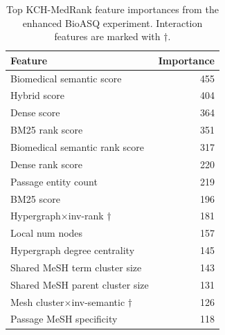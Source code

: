 \begin{table}[t]
\centering
\small
\caption{Top KCH-MedRank feature importances from the enhanced BioASQ experiment. Interaction features are marked with $\dagger$.}
\label{tab:feature-importance-summary}
\begin{tabular}{lr}
\toprule
Feature & Importance \\
\midrule
Biomedical semantic score & 455 \\
Hybrid score & 404 \\
Dense score & 364 \\
BM25 rank score & 351 \\
Biomedical semantic rank score & 317 \\
Dense rank score & 220 \\
Passage entity count & 219 \\
BM25 score & 196 \\
Hypergraph$\times$inv-rank $\dagger$ & 181 \\
Local num nodes & 157 \\
Hypergraph degree centrality & 145 \\
Shared MeSH term cluster size & 143 \\
Shared MeSH parent cluster size & 131 \\
Mesh cluster$\times$inv-semantic $\dagger$ & 126 \\
Passage MeSH specificity & 118 \\
\bottomrule
\end{tabular}
\end{table}
